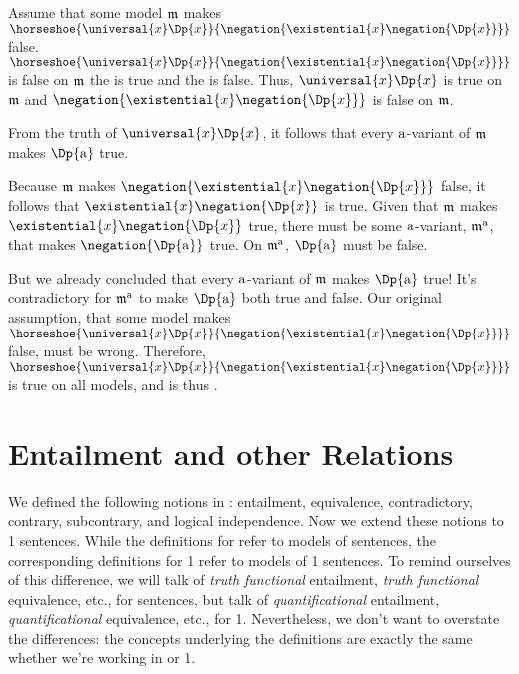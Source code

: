 \begin{PROOF}
Assume that some model $\mathfrak{m}$ makes $\horseshoe{\universal{\variable{x}}\Dp{\variable{x}}}{\negation{\existential{\variable{x}}\negation{\Dp{\variable{x}}}}}$ false. $\horseshoe{\universal{\variable{x}}\Dp{\variable{x}}}{\negation{\existential{\variable{x}}\negation{\Dp{\variable{x}}}}}$ is false on $\mathfrak{m}$ \Iff the  is true and the  is false. Thus, $\universal{\variable{x}}\Dp{\variable{x}}$ is true on $\mathfrak{m}$ and $\negation{\existential{\variable{x}}\negation{\Dp{\variable{x}}}}$ is false on $\mathfrak{m}$. 

From the truth of $\universal{\variable{x}}\Dp{\variable{x}}$, it follows that every $\mathrm{a}$-variant of $\mathfrak{m}$ makes $\Dp{\constant{a}}$ true.

Because $\mathfrak{m}$ makes $\negation{\existential{\variable{x}}\negation{\Dp{\variable{x}}}}$ false, it follows that $\existential{\variable{x}}\negation{\Dp{\variable{x}}}$ is true.  Given that $\mathfrak{m}$ makes $\existential{\variable{x}}\negation{\Dp{\variable{x}}}$ true, there must be some $\mathrm{a}$-variant, $\mathfrak{m^{\mathrm{\mathrm{a}}}_{\mathrm{}}}$, that makes $\negation{\Dp{\constant{a}}}$ true.  On $\mathfrak{m^{\mathrm{\mathrm{a}}}_{\mathrm{}}}$, $\Dp{\constant{a}}$ must be false.

But we already concluded that every $\mathrm{a}$-variant of $\mathfrak{m}$ makes $\Dp{\constant{a}}$ true!  It's contradictory for $\mathfrak{m^{\mathrm{\mathrm{a}}}_{\mathrm{}}}$ to make $\Dp{\constant{a}}$ both true and false.  Our original assumption, that some model makes $\horseshoe{\universal{\variable{x}}\Dp{\variable{x}}}{\negation{\existential{\variable{x}}\negation{\Dp{\variable{x}}}}}$ false, must be wrong.  Therefore, $\horseshoe{\universal{\variable{x}}\Dp{\variable{x}}}{\negation{\existential{\variable{x}}\negation{\Dp{\variable{x}}}}}$ is true on all models, and is thus .
\end{PROOF}


\section{Entailment and other Relations}\label{GQL1 Entailment and other Relations}

We defined the following notions in \GSL{}: entailment, equivalence, contradictory, contrary, subcontrary, and logical independence. 
Now we extend these notions to \GQL{}1 sentences. 
While the definitions for \GSL{} refer to models of \GSL{} sentences, the corresponding definitions for \GQL{}1 refer to models of \GQL{}1 sentences. 
To remind ourselves of this difference, we will talk of \emph{truth functional} entailment, \emph{truth functional} equivalence, etc., for \GSL{} sentences, but talk of \emph{quantificational} entailment, \emph{quantificational} equivalence, etc., for \GQL{}1. 
Nevertheless, we don't want to overstate the differences: the concepts underlying the definitions are exactly the same whether we're working in \GSL{} or \GQL{}1.

